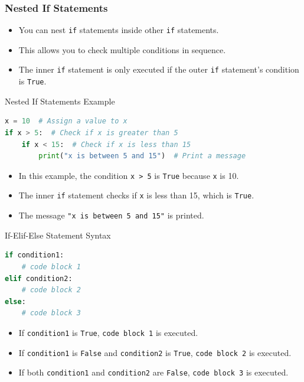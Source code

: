 \documentclass{beamer}
\begin{document}
\begin{frame}
    \frametitle{Nested If Statements}
    \begin{itemize}
        \item You can nest \texttt{if} statements inside other \texttt{if} statements.
        \item This allows you to check multiple conditions in sequence.
        \item The inner \texttt{if} statement is only executed if the outer \texttt{if} statement's condition is \texttt{True}.
    \end{itemize}
\end{frame}

\begin{frame}[fragile]{Nested If Statements Example}
    \begin{lstlisting}[style=colorful, language=Python]
x = 10  # Assign a value to x
if x > 5:  # Check if x is greater than 5
    if x < 15:  # Check if x is less than 15
        print("x is between 5 and 15")  # Print a message
    \end{lstlisting}
    \begin{itemize}
        \item In this example, the condition \texttt{x > 5} is \texttt{True} because \texttt{x} is 10.
        \item The inner \texttt{if} statement checks if \texttt{x} is less than 15, which is \texttt{True}.
        \item The message \texttt{"x is between 5 and 15"} is printed.
    \end{itemize}
\end{frame}

\begin{frame}[fragile]{If-Elif-Else Statement Syntax}
    \begin{lstlisting}[style=colorful, language=Python]
if condition1:
    # code block 1
elif condition2:
    # code block 2
else:
    # code block 3
    \end{lstlisting}
    \begin{itemize}
        \item If \texttt{condition1} is \texttt{True}, \texttt{code block 1} is executed.
        \item If \texttt{condition1} is \texttt{False} and \texttt{condition2} is \texttt{True}, \texttt{code block 2} is executed.
        \item If both \texttt{condition1} and \texttt{condition2} are \texttt{False}, \texttt{code block 3} is executed.
    \end{itemize}
\end{frame} 
\end{document}
